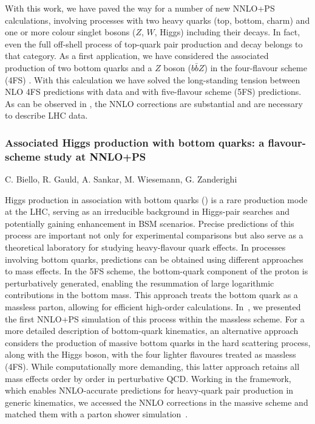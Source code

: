 \documentclass{FBR_Bericht_2025}
\begin{document}
\begin{refsection}
With this work, we have paved the way for a number of new NNLO+PS calculations, involving processes with two heavy quarks (top, bottom, charm) 
and one or more colour singlet bosons ($Z$, $W$, Higgs) including their decays. In fact, even the full off-shell process of top-quark pair production 
and decay belongs to that category. As a first application, we have considered the associated production of two bottom quarks and a $Z$ boson ($b\bar{b}Z$)
in the four-flavour scheme (4FS) \cite{Mazzitelli:2024ura}. With this calculation we have solved the long-standing tension between NLO 4FS predictions with data and with five-flavour scheme (5FS) predictions. 
As can be observed in , the NNLO corrections are substantial and are necessary to describe LHC data.



\subsubsection{Associated Higgs production with bottom quarks: a flavour-scheme study at NNLO+PS}
\begin{Namen}
C. Biello, R. Gauld, A. Sankar, M. Wiesemann, G. Zanderighi
\end{Namen}
Higgs production in association with bottom quarks (\bbH{}) is a rare production mode at the LHC, serving as an irreducible background in Higgs-pair searches and potentially gaining enhancement in BSM scenarios. 
Precise predictions of this process are important not only for experimental comparisons but also serve as a theoretical laboratory for studying heavy-flavour quark effects. 
In processes involving bottom quarks, predictions can be obtained using different approaches to mass effects. In the 5FS scheme, the bottom-quark component of the proton is perturbatively generated, enabling the resummation of large logarithmic contributions in the bottom mass. 
This approach treats the bottom quark as a massless parton, allowing for efficient high-order calculations. In~, we presented the first NNLO+PS simulation of this process within the massless scheme. For a more detailed description of bottom-quark kinematics, an alternative approach considers the production of massive bottom quarks in the hard scattering process, along with the Higgs boson, with the four lighter flavoures treated as massless (4FS). 
While computationally more demanding, this latter approach retains all mass effects order by order in perturbative QCD. Working in the \minnlo{} framework, which enables NNLO-accurate predictions for heavy-quark pair production in generic kinematics, we accessed the NNLO corrections in the massive scheme and matched them with a parton shower simulation~. 

\end{refsection}
\end{document}
